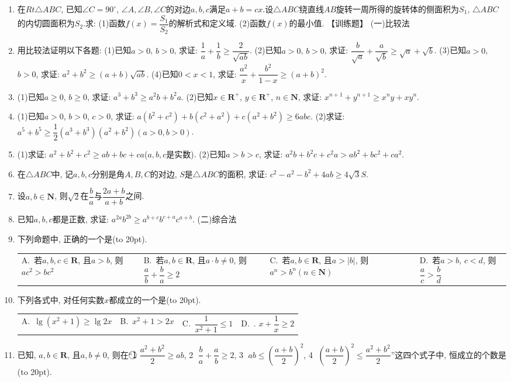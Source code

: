 \documentclass[10pt,a4paper]{article}
\newcommand{\bracket}[1]{(\hbox to #1pt{})}
\newcommand{\fourch}[4]{\par\begin{tabular}{p{.23\textwidth}p{.23\textwidth}p{.23\textwidth}p{.23\textwidth}}
A.~#1 &B.~#2& C.~#3& D.~#4
\end{tabular}}
\begin{document}
\begin{enumerate}[1.]
    \item 在$Rt\triangle ABC$, 已知$\angle C=90^\circ$, $\angle A,\angle B,\angle C$的对边$a,b,c$满足$a+b=cx$.设$\triangle ABC$绕直线$AB$旋转一周所得的旋转体的侧面积为$S_1$, $\triangle ABC$的内切圆面积为$S_2$.求:
    (1)函数$f(x)=\dfrac{S_1}{S_2}$的解析式和定义域.
    (2)函数$f(x)$的最小值.
    【训练题】
    (一)比较法
    \item 用比较法证明以下各题:
    (1)已知$a>0$, $b>0$, 求证: $\dfrac 1a+\dfrac 1b\ge \dfrac 2{\sqrt{ab}}$.
    (2)已知$a>0$, $b>0$, 求证: $\dfrac b{\sqrt a}+\dfrac a{\sqrt b}\ge \sqrt a+\sqrt b$.
    (3)已知$a>0$, $b>0$, 求证: ${a^2}+{b^2}\ge (a+b)\sqrt{ab}$.
    (4)已知$0<x<1$, 求证: $\dfrac{a^2}x+\dfrac{b^2}{1-x}\ge (a+b)^2$.
    \item (1)已知$a\ge 0$, $b\ge 0$, 求证: $a^3+b^3\ge a^2b+b^2a$.
       (2)已知$x\in \mathbf{R}^+$, $y\in \mathbf{R}^+$, $n\in \mathbf{N}$, 求证: ${x^{n+1}}+{y^{n+1}}\ge x^ny+xy^n$.
    \item (1)已知$a>0$, $b>0$, $c>0$, 求证: $a(b^2+c^2)+b(c^2+a^2)+c(a^2+b^2)\ge 6abc$.
       (2)求证: ${a^5}+{b^5}\ge \dfrac 12({a^3}+{b^3})({a^2}+{b^2})(a>0,b>0)$.
    \item (1)求证: $a^2+b^2+c^2\ge ab+bc+ca$($a,b,c$是实数).
       (2)已知$a>b>c$, 求证: $a^2b+b^2c+c^2a>ab^2+bc^2+ca^2$.
    \item 在$\triangle ABC$中, 记$a,b,c$分别是角$A,B,C$的对边, $S$是$\triangle ABC$的面积, 求证: ${c^2}-{a^2}-{b^2}+4ab\ge 4\sqrt 3S$.
    \item 设$a,b\in \mathbf{N}$, 则$\sqrt 2$在$\dfrac ba$与$\dfrac{2a+b}{a+b}$之间.
    \item 已知$a,b,c$都是正数, 求证: ${a^{2a}}{b^{2b}}\ge {a^{b+c}}{b^{c+a}}{c^{a+b}}$.
    (二)综合法
    \item 下列命题中, 正确的一个是\bracket{20}.
    \fourch{若$a,b,c\in \mathbf{R}$, 且$a>b$, 则$ac^2>bc^2$}{若$a,b\in \mathbf{R}$, 且$a\cdot b\ne 0$, 则$\dfrac ab+\dfrac ba\ge 2$}{若$a,b\in \mathbf{R}$, 且$a>|b|$, 则$a^n>b^n(n\in \mathbf{N})$}{若$a>b$, $c<d$, 则$\dfrac ac>\dfrac bd$}
    \item 下列各式中, 对任何实数$x$都成立的一个是\bracket{20}.
    \fourch{$\lg (x^2+1)\ge \lg 2x$}{$x^2+1>2x$}{$\dfrac 1{{x^2}+1}\le 1$}{. $x+\dfrac 1x\ge 2$}
    \item 已知, $a,b\in \mathbf{R}$, 	且$a,b\ne 0$, 则在``\textcircled{1} $\dfrac{{a^2}+{b^2}}2\ge ab$, \textcircled{2} $\dfrac ba+\dfrac ab\ge 2$, \textcircled{3} $ab\le (\dfrac{a+b}2)^2$, \textcircled{4} $(\dfrac{a+b}2)^2\le \dfrac{{a^2}+{b^2}}2$''这四个式子中, 恒成立的个数是\bracket{20}.

\end{enumerate}
\end{document}
